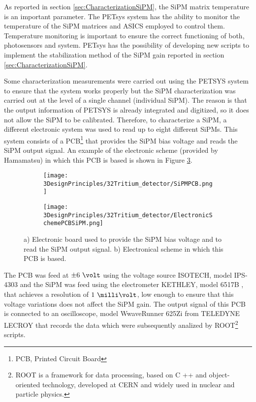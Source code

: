 As reported in section \ref{sec:CharacterizationSiPM}, the SiPM matrix temperature is an important parameter. The PETsys system has the ability to monitor the temperature of the SiPM matrices and ASICS employed to control them. Temperature monitoring is important to ensure the correct functioning of both, photosensors and system. PETsys has the possibility of developing new scripts to implement the stabilization method of the SiPM gain reported in section \ref{sec:CharacterizationSiPM}.

Some characterization measurements were carried out using the PETSYS system to ensure that the system works properly but the SiPM characterization was carried out at the level of a single channel (individual SiPM). The reason is that the output information of PETSYS is already integrated and digitized, so it does not allow the SiPM to be calibrated. Therefore, to characterize a SiPM, a different electronic system was used to read up to eight different SiPMs. This system consists of a PCB\footnote{PCB, Printed Circuit Board} that provides the SiPM bias voltage and reads the SiPM output signal. An example of the electronic scheme (provided by Hamamatsu) in which this PCB is based is shown in Figure \ref{fig:PCBSiPM}.

\begin{figure}
\centering
    \begin{subfigure}[b]{0.5\textwidth}
    \centering
    \texttt{[image: 3DesignPrinciples/32Tritium\_detector/SiPMPCB.png]}  
    \caption{\label{subfig:ElectronicBoardSiPM}}
    \end{subfigure}
    \hfill
    \begin{subfigure}[b]{0.45\textwidth}
    \centering
    \texttt{[image: 3DesignPrinciples/32Tritium\_detector/ElectronicSchemePCBSiPM.png]}  
    \caption{\label{subfig:ElectronicSchemePCBSiPM}}
    \end{subfigure}
    \hfill
 \caption{a) Electronic board used to provide the SiPM bias voltage and to read the SiPM output signal. b) Electronical scheme in which this PCB is based.}
 \label{fig:PCBSiPM}
\end{figure}
The PCB was feed at $\pm6~\volt$ using the voltage source ISOTECH, model IPS-4303 \cite{VoltageSourceISOTECH} and the SiPM was feed using the electrometer KETHLEY, model 6517B \cite{VoltageSourceKethley}, that achieves a resolution of $1~\milli\volt$, low enough to ensure that this voltage variations does not affect the SiPM gain. The output signal of this PCB is connected to an oscilloscope, model WwaveRunner 625Zi from TELEDYNE LECROY \cite{OscilloscopeIFIMED} that records the data which were subsequently analized by ROOT\footnote{ROOT is a framework for data processing, based on C ++ and object-oriented technology, developed at CERN and widely used in nuclear and particle physics.} scripts.